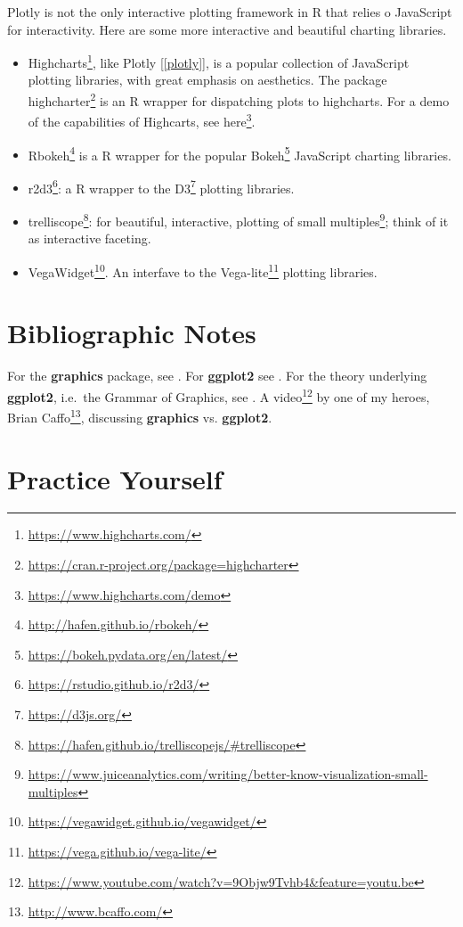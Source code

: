 \documentclass[]{book}
\renewcommand{\href}[2]{#2\footnote{\url{#1}}}
\theoremstyle{definition}
\theoremstyle{definition}
\theoremstyle{definition}
\theoremstyle{remark}
\begin{document}
Plotly is not the only interactive plotting framework in R that relies o JavaScript for interactivity.
Here are some more interactive and beautiful charting libraries.

\begin{itemize}
\item
  \href{https://www.highcharts.com/}{Highcharts}, like Plotly {[}\ref{plotly}{]}, is a popular collection of JavaScript plotting libraries, with great emphasis on aesthetics.
  The package \href{https://cran.r-project.org/package=highcharter}{highcharter} is an R wrapper for dispatching plots to highcharts.
  For a demo of the capabilities of Highcarts, see \href{https://www.highcharts.com/demo}{here}.
\item
  \href{http://hafen.github.io/rbokeh/}{Rbokeh} is a R wrapper for the popular \href{https://bokeh.pydata.org/en/latest/}{Bokeh} JavaScript charting libraries.
\item
  \href{https://rstudio.github.io/r2d3/}{r2d3}: a R wrapper to the \href{https://d3js.org/}{D3} plotting libraries.
\item
  \href{https://hafen.github.io/trelliscopejs/\#trelliscope}{trelliscope}: for beautiful, interactive, plotting of \href{https://www.juiceanalytics.com/writing/better-know-visualization-small-multiples}{small multiples}; think of it as interactive faceting.
\item
  \href{https://vegawidget.github.io/vegawidget/}{VegaWidget}. An interfave to the \href{https://vega.github.io/vega-lite/}{Vega-lite} plotting libraries.
\end{itemize}

\hypertarget{bibliographic-notes-10}{%
\section{Bibliographic Notes}\label{bibliographic-notes-10}}

For the \textbf{graphics} package, see \citet{Rlanguage}.
For \textbf{ggplot2} see \citet{ggplot2}.
For the theory underlying \textbf{ggplot2}, i.e.~the Grammar of Graphics, see \citet{wilkinson2006grammar}.
A \href{https://www.youtube.com/watch?v=9Objw9Tvhb4\&feature=youtu.be}{video} by one of my heroes, \href{http://www.bcaffo.com/}{Brian Caffo}, discussing \textbf{graphics} vs. \textbf{ggplot2}.

\hypertarget{practice-yourself-8}{%
\section{Practice Yourself}\label{practice-yourself-8}}
\end{document}

